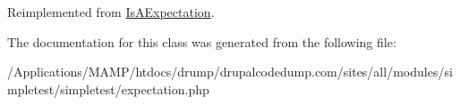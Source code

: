 Reimplemented from \hyperlink{class_is_a_expectation_af5e73859e22cd3ed97e13edda31de53e}{IsAExpectation}.

The documentation for this class was generated from the following file:\begin{DoxyCompactItemize}
\item 
/Applications/MAMP/htdocs/drump/drupalcodedump.com/sites/all/modules/simpletest/simpletest/expectation.php\end{DoxyCompactItemize}
